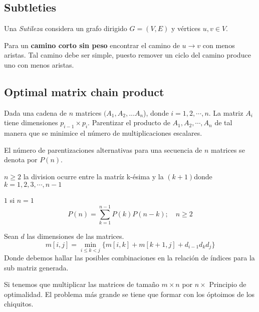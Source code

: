 \documentclass[tikz,11pt,fleqn]{book} %
\begin{document}
\subsection{Subtleties}
Una \textit{Sutileza} considera un grafo dirigido $G=(V,E)$ y vértices $u,v\in V$.

Para un \textbf{camino corto sin peso} encontrar el camino de $u\to
	v$ con menos aristas. Tal camino debe ser simple, puesto remover un ciclo del camino produce uno con menos aristas.



\subsection{Optimal matrix chain product}
Dada una cadena de $n$ matrices $(A_1,A_2,...A_n$), donde $i=1,2,\cdots,n$. La matriz $A_i$ tiene dimensiones $p_{i-1}\times p_i$. Parentizar el producto de $A_1,A_2,\cdots,A_n$ de tal manera que se minimice el número de multiplicaciones escalares.
\begin{fact}
	El número de parentizaciones alternativas para una secuencia de $n$ matrices se denota por $P(n)$.
\end{fact}
\begin{fact}
	$n\ge 2$ la division ocurre entre la matríz k-ésima y la $(k+1) $donde $k=1,2,3,\cdots,n-1$
\end{fact}
\begin{fact}
	$1$ si $n=1$
	$$ P(n)= \sum_{k=1}^{n-1} P(k) P(n-k);\quad n\ge2
	$$
\end{fact}

\begin{theorem}
	Sean $d$ las dimensiones de las matrices.
	$$ m[i,j]=\min_{i\le k<j}\{m[i,k]+m[k+1,j]+d_{i-1}d_kd_j \} $$
	Donde debemos hallar las posibles combinaciones en la relación de índices para la sub matriz generada.
\end{theorem}

\begin{example}
	Si tenemos que multiplicar las matrices de tamaño $m\times n$ por $n\times$
	Principio de optimalidad. El problema más grande se tiene que formar con los óptoimos de los chiquitos.
\end{example}
\end{document}
